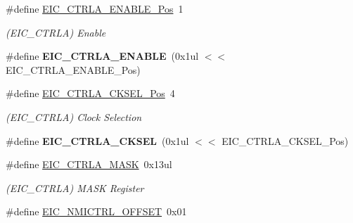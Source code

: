 \begin{DoxyCompactItemize}
\item 
\hypertarget{group___s_a_m_l21___e_i_c_gaeacc7e5f83ca757ca0130db5895e170a}{}\#define \hyperlink{group___s_a_m_l21___e_i_c_gaeacc7e5f83ca757ca0130db5895e170a}{E\+I\+C\+\_\+\+C\+T\+R\+L\+A\+\_\+\+E\+N\+A\+B\+L\+E\+\_\+\+Pos}~1\label{group___s_a_m_l21___e_i_c_gaeacc7e5f83ca757ca0130db5895e170a}

\begin{DoxyCompactList}\small\item\em (E\+I\+C\+\_\+\+C\+T\+R\+L\+A) Enable \end{DoxyCompactList}\item 
\hypertarget{group___s_a_m_l21___e_i_c_gab810341b359545733a3d0caab65125d3}{}\#define {\bfseries E\+I\+C\+\_\+\+C\+T\+R\+L\+A\+\_\+\+E\+N\+A\+B\+L\+E}~(0x1ul $<$$<$ E\+I\+C\+\_\+\+C\+T\+R\+L\+A\+\_\+\+E\+N\+A\+B\+L\+E\+\_\+\+Pos)\label{group___s_a_m_l21___e_i_c_gab810341b359545733a3d0caab65125d3}

\item 
\hypertarget{group___s_a_m_l21___e_i_c_ga9c2e0f5f9272f9ca106bee3658bd67e6}{}\#define \hyperlink{group___s_a_m_l21___e_i_c_ga9c2e0f5f9272f9ca106bee3658bd67e6}{E\+I\+C\+\_\+\+C\+T\+R\+L\+A\+\_\+\+C\+K\+S\+E\+L\+\_\+\+Pos}~4\label{group___s_a_m_l21___e_i_c_ga9c2e0f5f9272f9ca106bee3658bd67e6}

\begin{DoxyCompactList}\small\item\em (E\+I\+C\+\_\+\+C\+T\+R\+L\+A) Clock Selection \end{DoxyCompactList}\item 
\hypertarget{group___s_a_m_l21___e_i_c_ga915a2ae36e8ddc2f74a15547c5a29f66}{}\#define {\bfseries E\+I\+C\+\_\+\+C\+T\+R\+L\+A\+\_\+\+C\+K\+S\+E\+L}~(0x1ul $<$$<$ E\+I\+C\+\_\+\+C\+T\+R\+L\+A\+\_\+\+C\+K\+S\+E\+L\+\_\+\+Pos)\label{group___s_a_m_l21___e_i_c_ga915a2ae36e8ddc2f74a15547c5a29f66}

\item 
\hypertarget{group___s_a_m_l21___e_i_c_ga935b501f29ee3b3ae95674baccfcc161}{}\#define \hyperlink{group___s_a_m_l21___e_i_c_ga935b501f29ee3b3ae95674baccfcc161}{E\+I\+C\+\_\+\+C\+T\+R\+L\+A\+\_\+\+M\+A\+S\+K}~0x13ul\label{group___s_a_m_l21___e_i_c_ga935b501f29ee3b3ae95674baccfcc161}

\begin{DoxyCompactList}\small\item\em (E\+I\+C\+\_\+\+C\+T\+R\+L\+A) M\+A\+S\+K Register \end{DoxyCompactList}\item 
\hypertarget{group___s_a_m_l21___e_i_c_ga955df6174347427aaaed840874fa273f}{}\#define \hyperlink{group___s_a_m_l21___e_i_c_ga955df6174347427aaaed840874fa273f}{E\+I\+C\+\_\+\+N\+M\+I\+C\+T\+R\+L\+\_\+\+O\+F\+F\+S\+E\+T}~0x01\label{group___s_a_m_l21___e_i_c_ga955df6174347427aaaed840874fa273f}


\end{DoxyCompactItemize}
